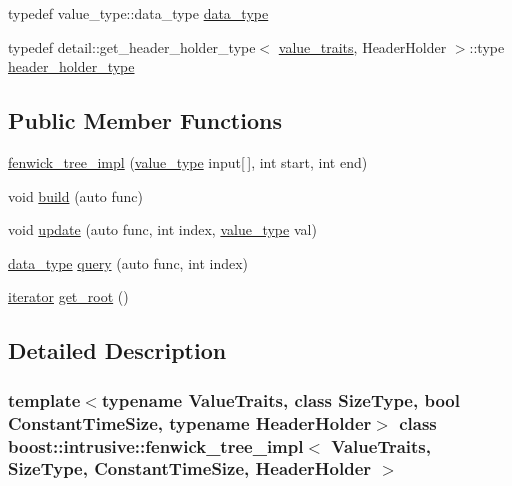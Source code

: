 \begin{DoxyCompactItemize}
\item 
typedef value\+\_\+type\+::data\+\_\+type \hyperlink{classboost_1_1intrusive_1_1fenwick__tree__impl_acc226a36fd0f4814574917193e0c59ef}{data\+\_\+type}
\item 
typedef detail\+::get\+\_\+header\+\_\+holder\+\_\+type$<$ \hyperlink{classboost_1_1intrusive_1_1fenwick__tree__impl_a2e87a9b3164c911991b62a4405bdca5f}{value\+\_\+traits}, Header\+Holder $>$\+::type \hyperlink{classboost_1_1intrusive_1_1fenwick__tree__impl_ae20783e43141c54fd66b9b0c582ed94a}{header\+\_\+holder\+\_\+type}
\end{DoxyCompactItemize}
\subsection*{Public Member Functions}
\begin{DoxyCompactItemize}
\item 
\hyperlink{classboost_1_1intrusive_1_1fenwick__tree__impl_a565935b00956127618afa4e65c4166f9}{fenwick\+\_\+tree\+\_\+impl} (\hyperlink{classboost_1_1intrusive_1_1fenwick__tree__impl_aefd70a2712872e79b867c1a5c59a4a26}{value\+\_\+type} input\mbox{[}$\,$\mbox{]}, int start, int end)
\item 
void \hyperlink{classboost_1_1intrusive_1_1fenwick__tree__impl_a77c1686e0488c841133aefcf7992b29c}{build} (auto func)
\item 
void \hyperlink{classboost_1_1intrusive_1_1fenwick__tree__impl_ab81aaa5b75e064b740db9ec6959a5ae6}{update} (auto func, int index, \hyperlink{classboost_1_1intrusive_1_1fenwick__tree__impl_aefd70a2712872e79b867c1a5c59a4a26}{value\+\_\+type} val)
\item 
\hyperlink{classboost_1_1intrusive_1_1fenwick__tree__impl_acc226a36fd0f4814574917193e0c59ef}{data\+\_\+type} \hyperlink{classboost_1_1intrusive_1_1fenwick__tree__impl_ab264157cf44f71965593bef1444d97ec}{query} (auto func, int index)
\item 
\hyperlink{classboost_1_1intrusive_1_1fenwick__tree__impl_a6293502e34de9b16ae198ec557c82132}{iterator} \hyperlink{classboost_1_1intrusive_1_1fenwick__tree__impl_a47f1c138ed862fc41b178ca30478e0f9}{get\+\_\+root} ()
\end{DoxyCompactItemize}


\subsection{Detailed Description}
\subsubsection*{template$<$typename Value\+Traits, class Size\+Type, bool Constant\+Time\+Size, typename Header\+Holder$>$\newline
class boost\+::intrusive\+::fenwick\+\_\+tree\+\_\+impl$<$ Value\+Traits, Size\+Type, Constant\+Time\+Size, Header\+Holder $>$}

